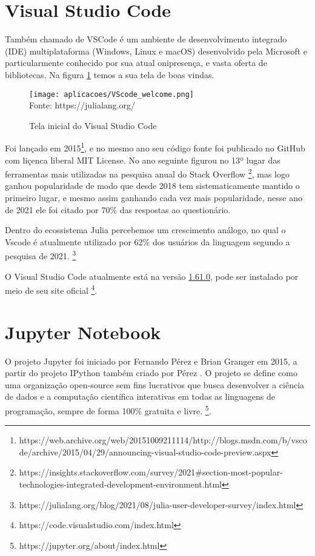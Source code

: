 \section{Visual Studio Code}
Também chamado de VSCode é um ambiente de desenvolvimento integrado (IDE) multiplataforma (Windows, Linux e macOS) desenvolvido pela Microsoft e particularmente conhecido por sua atual onipresença, e vasta oferta de bibliotecas. 
Na figura \ref{VScode_welcome} temos a sua tela de boas vindas.
\begin{figure}[H]
 \begin{center}
     \caption{Tela inicial do Visual Studio Code} \label{VScode_welcome}
     \texttt{[image: aplicacoes/VScode\_welcome.png]} \\
     {\tiny \sf Fonte: https://julialang.org/}
 \end{center}
\end{figure} 
Foi lançado em 2015\footnote{https://web.archive.org/web/20151009211114/http://blogs.msdn.com/b/vscode/archive/2015/04/29/announcing-visual-studio-code-preview.aspx}, e no mesmo ano seu código fonte foi publicado no GitHub com liçenca liberal MIT License. 
No ano seguinte figurou no 13º lugar das ferramentas mais utilizadas na pesquisa anual do Stack Overflow \footnote{https://insights.stackoverflow.com/survey/2021\#section-most-popular-technologies-integrated-development-environment.html}, mas logo ganhou popularidade de modo que desde 2018 tem sistematicamente mantido o primeiro lugar, e mesmo assim ganhando cada vez mais popularidade, nesse ano de 2021 ele foi citado por 70\% das respostas ao questionário. 

Dentro do ecossistema Julia percebemos um crescimento análogo, no qual o Vscode é atualmente utilizado por 62\% dos usuários da linguagem segundo a pesquisa de 2021. \footnote{https://julialang.org/blog/2021/08/julia-user-developer-survey/index.html}

O Visual Studio Code atualmente está na versão \href{https://github.com/microsoft/vscode/releases/tag/1.61.0}{1.61.0}, pode ser instalado por meio de seu site oficial \footnote{https://code.visualstudio.com/index.html}.
\section{Jupyter Notebook}

O projeto Jupyter \cite{Kluyver2016} foi iniciado por Fernando Pérez e Brian Granger em 2015, a partir do projeto IPython também criado por Pérez \cite{Perez2007}.
O projeto se define como uma organização open-source sem fins lucrativos que busca desenvolver a ciência de dados e a computação científica interativas em todas as linguagens de programação, sempre de forma 100\% gratuita e livre. \footnote{https://jupyter.org/about/index.html}. 

